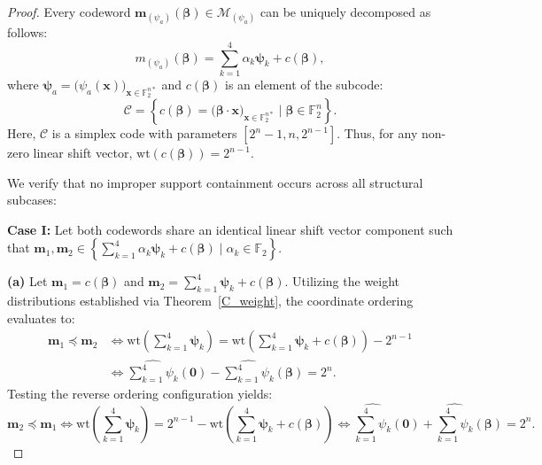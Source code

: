 \documentclass[10pt,a4paper]{amsart}
\begin{document}
\begin{proof}
Every codeword $\mathbf{m}_{(\psi_a)}(\mathbf{\beta}) \in \mathcal{M}_{(\psi_a)}$ can be uniquely decomposed as follows:
\[
m_{(\psi_a)}(\mathbf{\beta})=\sum_{k=1}^{4}\alpha_k \mathbf{\psi}_k + c(\mathbf{\beta}),
\]
where $\mathbf{\psi}_a = \bigl(\psi_a(\mathbf{x})\bigr)_{\mathbf{x} \in \mathbb{F}_2^{n*}}$ and $c(\mathbf{\beta})$ is an element of the subcode:
\[
\mathcal{C}=\left\{c(\mathbf{\beta})=\bigl(\mathbf{\beta}\cdot \mathbf{x}\bigr)_{\mathbf{x} \in \mathbb{F}_2^{n*}} \mid \mathbf{\beta}\in \mathbb{F}_2^n\right\}.
\]
Here, $\mathcal{C}$ is a simplex code with parameters $[2^n - 1, n, 2^{n-1}]$. Thus, for any non-zero linear shift vector, $\mathrm{wt}(c(\mathbf{\beta})) = 2^{n-1}$. 

We verify that no improper support containment occurs across all structural subcases:

\textbf{Case I:} Let both codewords share an identical linear shift vector component such that $\mathbf{m}_1, \mathbf{m}_2 \in \left\{\sum_{k=1}^{4} \alpha_k \mathbf{\psi}_k + c(\mathbf{\beta}) \mid \alpha_k \in \mathbb{F}_2 \right\}$. 

\textbf{(a)} Let $\mathbf{m}_1 = c(\mathbf{\beta})$ and $\mathbf{m}_2 = \sum_{k=1}^{4} \mathbf{\psi}_k + c(\mathbf{\beta})$. Utilizing the weight distributions established via Theorem~\ref{C_weight}, the coordinate ordering evaluates to:
\begin{align*}
\mathbf{m}_1 \preceq \mathbf{m}_2 &\Leftrightarrow 
\mathrm{wt}\!\left(\sum_{k=1}^{4} \mathbf{\psi}_k\right) 
= \mathrm{wt}\!\left(\sum_{k=1}^{4} \mathbf{\psi}_k + c(\mathbf{\beta})\right) - 2^{n-1}\\
& \Leftrightarrow \widehat{\sum_{k=1}^{4} \psi_k}(\mathbf{0}) - \widehat{\sum_{k=1}^{4} \psi_k}(\mathbf{\beta}) = 2^n.
\end{align*}
Testing the reverse ordering configuration yields:
\[
\mathbf{m}_2 \preceq \mathbf{m}_1 \Leftrightarrow 
\mathrm{wt}\!\left(\sum_{k=1}^{4} \mathbf{\psi}_k\right) 
= 2^{n-1} - \mathrm{wt}\!\left(\sum_{k=1}^{4} \mathbf{\psi}_k + c(\mathbf{\beta})\right)
\Leftrightarrow \widehat{\sum_{k=1}^{4} \psi_k}(\mathbf{0}) + \widehat{\sum_{k=1}^{4} \psi_k}(\mathbf{\beta}) = 2^n.
\]


\end{proof}
\end{document}
